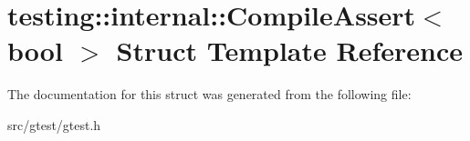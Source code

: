 \hypertarget{structtesting_1_1internal_1_1_compile_assert}{}\section{testing\+:\+:internal\+:\+:Compile\+Assert$<$ bool $>$ Struct Template Reference}
\label{structtesting_1_1internal_1_1_compile_assert}


The documentation for this struct was generated from the following file\+:\begin{DoxyCompactItemize}
\item 
src/gtest/gtest.\+h\end{DoxyCompactItemize}
